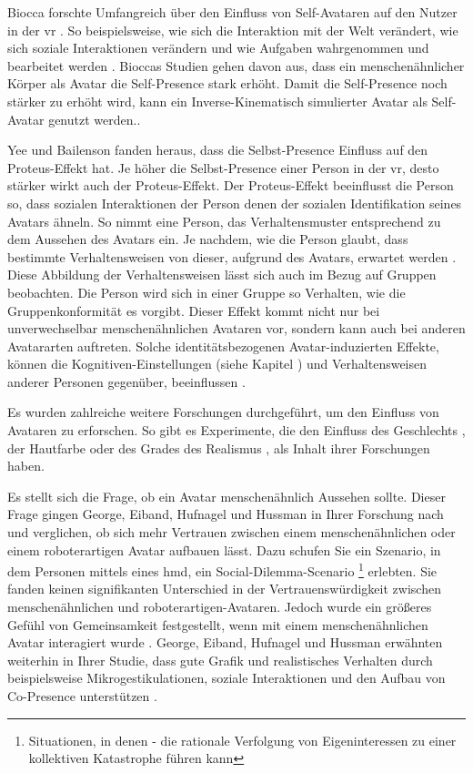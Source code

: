 \documentclass[a4paper,11pt]{article}%
\renewcommand{\\}{\vspace*{0.5\baselineskip} \newline}
\begin{document}
Biocca forschte Umfangreich über den Einfluss von Self-Avataren auf den Nutzer in der \ac{vr} \citep[421-427]{construal2014connected}.
\newline So beispielsweise, wie sich die Interaktion mit der Welt verändert, wie sich soziale Interaktionen verändern und wie Aufgaben wahrgenommen und bearbeitet werden \citep{benford1995user} \citep{bowers1996talk}.
Bioccas Studien gehen davon aus, dass ein menschenähnlicher Körper als Avatar die Self-Presence stark erhöht. Damit die Self-Presence noch stärker zu erhöht wird, kann ein Inverse-Kinematisch simulierter Avatar als Self-Avatar genutzt werden.\citep[421-427]{construal2014connected}.

Yee und Bailenson fanden heraus, dass die Selbst-Presence Einfluss auf den Proteus-Effekt hat. Je höher die Selbst-Presence einer Person in der \ac{vr}, desto stärker wirkt auch der Proteus-Effekt. Der Proteus-Effekt beeinflusst die Person so, dass sozialen Interaktionen der Person denen der sozialen Identifikation seines Avatars ähneln. So nimmt eine Person, das Verhaltensmuster entsprechend zu dem Aussehen des Avatars ein. Je nachdem, wie die Person glaubt, dass bestimmte Verhaltensweisen von dieser, aufgrund des Avatars, erwartet werden \citep{ratan2015leveling}.
Diese Abbildung der Verhaltensweisen lässt sich auch im Bezug auf Gruppen beobachten. Die Person wird sich in einer Gruppe so Verhalten, wie die Gruppenkonformität es vorgibt.
Dieser Effekt kommt nicht nur bei unverwechselbar menschenähnlichen Avataren vor, sondern kann auch bei anderen Avatararten auftreten. Solche identitätsbezogenen Avatar-induzierten Effekte, können die \dq{}Kognitiven-Einstellungen\dq{} (siehe Kapitel \textit{}) und Verhaltensweisen anderer Personen gegenüber, beeinflussen \citep{lok2003effects}.

Es wurden zahlreiche weitere Forschungen durchgeführt, um den Einfluss von Avataren zu erforschen. So gibt es Experimente, die den Einfluss des Geschlechts \cite{slater2010first}, der Hautfarbe \cite{peck2013putting} oder des Grades des Realismus \cite{roth2016avatar}, als Inhalt ihrer Forschungen haben.

Es stellt sich die Frage, ob ein Avatar menschenähnlich Aussehen sollte. Dieser Frage gingen George, Eiband, Hufnagel und Hussman \cite{george2018trusting} in Ihrer Forschung nach und verglichen, ob sich mehr Vertrauen zwischen einem menschenähnlichen oder einem roboterartigen Avatar aufbauen lässt.
Dazu schufen Sie ein Szenario, in dem Personen mittels eines \ac{hmd}, ein Social-Dilemma-Scenario \footnote{Situationen, in denen - die rationale Verfolgung von Eigeninteressen zu einer kollektiven Katastrophe führen kann} erlebten. Sie fanden keinen signifikanten Unterschied in der Vertrauenswürdigkeit zwischen menschenähnlichen und roboterartigen-Avataren. Jedoch wurde ein größeres Gefühl von Gemeinsamkeit festgestellt, wenn mit einem menschenähnlichen Avatar interagiert wurde \citep{kerr1983motivation}.
George, Eiband, Hufnagel und Hussman erwähnten weiterhin in Ihrer Studie, dass gute Grafik und realistisches Verhalten durch beispielsweise Mikrogestikulationen, soziale Interaktionen und den Aufbau von \dq{}Co-Presence\dq{} unterstützen \citep{george2018trusting}.
\end{document}
